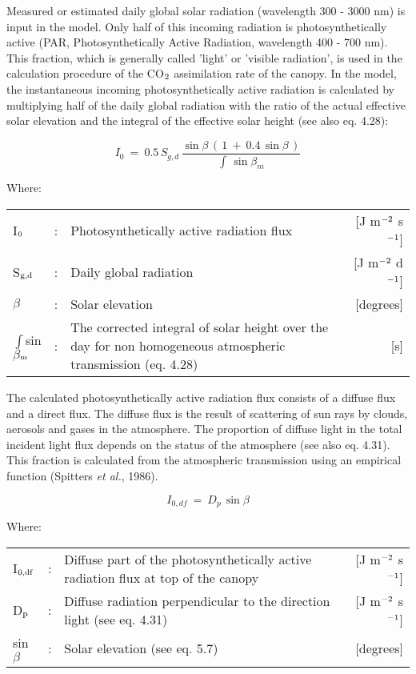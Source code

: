 Measured or estimated daily global solar radiation  (wavelength 300 - 3000 nm) is input
in the model. Only half of this incoming radiation is photosynthetically active (PAR,
Photosynthetically Active Radiation, wavelength 400 - 700 nm). This fraction, which is
generally called 'light' or 'visible radiation', is used in the calculation procedure of the
CO$_{{\rm 2}}$ assimilation rate of the canopy. In the model, the instantaneous incoming photosyn\-thet\-ically active radiation is calculated by multiply\-ing half of the daily global radiation
with the ratio of the actual effective solar elevation and the integral of the effective solar
height (see also eq. 4.28):

\begin{equation}
I _{0} ~=~ 0.5\, S _{g,d} \,{\frac{\sin \beta \, (\, 1~+~0.4\, \sin \beta \, )}{\int \, \sin \beta _{m} }}
\end{equation}

Where:\\
\begin{tabularx}{\textwidth}{llXr}
I$_{{\rm 0}}$ &:& Photosynthetically active radia\-tion flux    &    [J m$^{{\rm -2}}$ s$^{{\rm -1}}$]\\
S$_{{\rm g,d}}$ &:& Daily global radiation   &     [J m$^{{\rm -2}}$ d$^{{\rm -1}}$] \\
$\beta$ &:& Solar elevation    &    [degrees]\\
$\int$sin$\beta$$_{{\rm m}}$ &:& The corrected integral of solar height over the day 
    for non homogeneous atmospheric transmission (eq. 4.28)   &     [s]\\
\end{tabularx}

The calculated photosynthetically active radiation flux consists of a diffuse flux and a
direct flux. The diffuse flux is the result of scattering of sun rays by clouds, aerosols and
gases in the atmosphere. The proportion of diffuse light in the total incident light flux
depends on the status of the atmosphere (see also eq. 4.31). This fraction is calculated
from the atmospheric transmission using an empirical function (Spitters {\it et al.\/}, 1986).

\begin{equation}
I _{0,df} ~=~ D _{p~} \sin \beta
\end{equation}

Where:\\
\begin{tabularx}{\textwidth}{llXr}
I$_{{\rm 0,df}}$ &:& Diffuse part of the photosynthetically active radiation flux 
   at top of the canopy    &    [J m$^{{\rm -2}}$ s$^{{\rm -1}}$]\\
D$_{{\rm p}}$ &:& Diffuse radiation perpendicular to the direction 
   light (see eq. 4.31)    &    [J m$^{{\rm -2}}$ s$^{{\rm -1}}$]\\
sin$\beta$ &:& Solar elevation (see eq. 5.7)    &    [degrees]\\
\end{tabularx}

